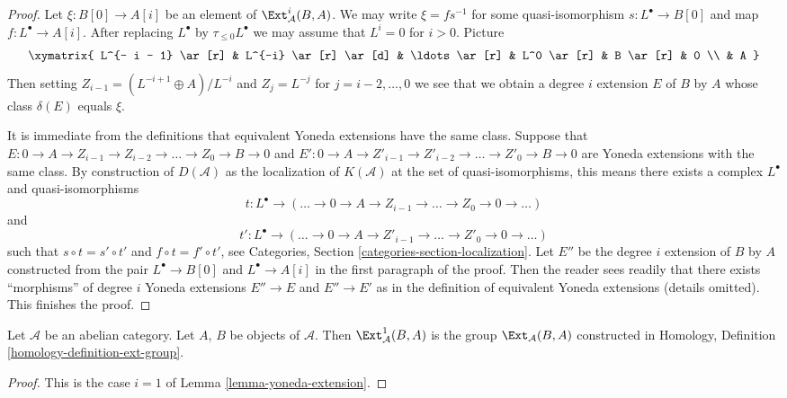 \begin{proof}
Let $\xi : B[0] \to A[i]$ be an element of $\Ext^i_\mathcal{A}(B, A)$.
We may write $\xi = f s^{-1}$ for some quasi-isomorphism
$s : L^\bullet \to B[0]$ and map $f : L^\bullet \to A[i]$.
After replacing $L^\bullet$ by $\tau_{\leq 0}L^\bullet$ we may assume
that $L^i = 0$ for $i > 0$. Picture
$$
\xymatrix{
L^{- i - 1} \ar[r] & L^{-i} \ar[r] \ar[d] & \ldots \ar[r] &
L^0 \ar[r] & B \ar[r] & 0 \\
& A
}
$$
Then setting $Z_{i - 1} = (L^{- i + 1} \oplus A)/L^{-i}$ and
$Z_j = L^{-j}$ for $j = i - 2, \ldots, 0$ we see that we obtain a
degree $i$ extension $E$ of $B$ by $A$ whose class $\delta(E)$ equals
$\xi$.

\medskip\noindent
It is immediate from the definitions that equivalent Yoneda extensions
have the same class. Suppose that
$E : 0 \to A \to Z_{i - 1} \to Z_{i - 2} \to \ldots \to Z_0 \to B \to 0$ and
$E' : 0 \to A \to Z'_{i - 1} \to Z'_{i - 2} \to \ldots \to Z'_0 \to B \to 0$
are Yoneda extensions with the same class.
By construction of $D(\mathcal{A})$ as the localization
of $K(\mathcal{A})$ at the set of quasi-isomorphisms, this means there
exists a complex $L^\bullet$ and quasi-isomorphisms
$$
t : L^\bullet \to
(\ldots \to 0 \to A \to Z_{i - 1} \to \ldots \to Z_0 \to 0 \to \ldots)
$$
and
$$
t' : L^\bullet \to
(\ldots \to 0 \to A \to Z'_{i - 1} \to \ldots \to Z'_0 \to 0 \to \ldots)
$$
such that $s \circ t = s' \circ t'$ and $f \circ t = f' \circ t'$, see
Categories, Section \ref{categories-section-localization}.
Let $E''$ be the degree $i$ extension of $B$ by $A$ constructed from
the pair $L^\bullet \to B[0]$ and $L^\bullet \to A[i]$ in the first
paragraph of the proof. Then the reader sees readily that there exists
``morphisms'' of degree $i$ Yoneda extensions $E'' \to E$ and $E'' \to E'$
as in the definition of equivalent Yoneda extensions (details omitted).
This finishes the proof.
\end{proof}

\begin{lemma}
\label{lemma-ext-1}
Let $\mathcal{A}$ be an abelian category. Let $A$, $B$ be objects
of $\mathcal{A}$. Then $\Ext^1_\mathcal{A}(B, A)$ is
the group $\Ext_\mathcal{A}(B, A)$ constructed in
Homology, Definition \ref{homology-definition-ext-group}.
\end{lemma}

\begin{proof}
This is the case $i = 1$ of
Lemma \ref{lemma-yoneda-extension}.
\end{proof}



